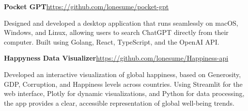\documentclass[letterpaper,11pt]{article}
\newcommand{\resumeItem}[1]{
  \item\small{
    {#1 \vspace{-1pt}}
  }
}
\begin{document}
        \resumeItem{\normalsize{\textbf{Pocket GPT}\hfill \href{https://github.com/lonesume/pocket-gpt}{https://github.com/lonesume/pocket-gpt}
        
      Designed and developed a desktop application that runs seamlessly on macOS, Windows, and Linux, allowing users to search ChatGPT directly from their computer. Built using Golang, React, TypeScript, and the OpenAI API.} 
        }

        
        
        
        \resumeItem{\normalsize{\textbf{Happyness Data Visualizer}\hfill \href{https://github.com/lonesume/Happiness-api}{https://github.com/lonesume/Happiness-api}
        
        Developed an interactive visualization of global happiness, based on Generosity, GDP, Corruption, and Happiness levels across countries. Using Streamlit for the web interface, Plotly for dynamic visualizations, and Python for data processing, the app provides a clear, accessible representation of global well-being trends.} 
        }


        
\end{document}
